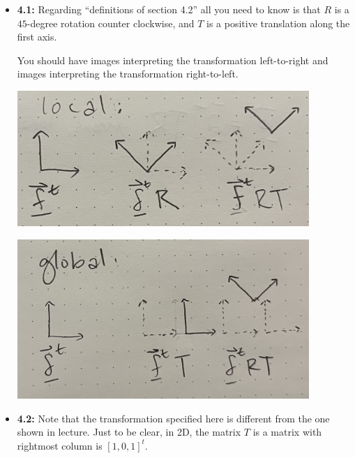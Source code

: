 \documentclass[letterpaper, 11pt]{article}
\begin{document}
\begin{itemize}
\item \textbf{4.1:} Regarding ``definitions of section 4.2'' all you need to know is that
$R$ is a $45$-degree rotation counter clockwise, and $T$ is a
positive translation  along the first axis.

You should have images interpreting the transformation left-to-right and images interpreting the transformation right-to-left.\\



\includegraphics[width=0.87\textwidth]{1.jpg}



\includegraphics[width=0.87\textwidth]{2.jpg}

\item \textbf{4.2:} Note that the transformation specified here is different from the one shown in lecture.
  Just to be clear, in 2D,
  the matrix $T$ is a matrix
  with rightmost column is $[1,0,1]^t$.\\


\end{itemize}
\end{document}
